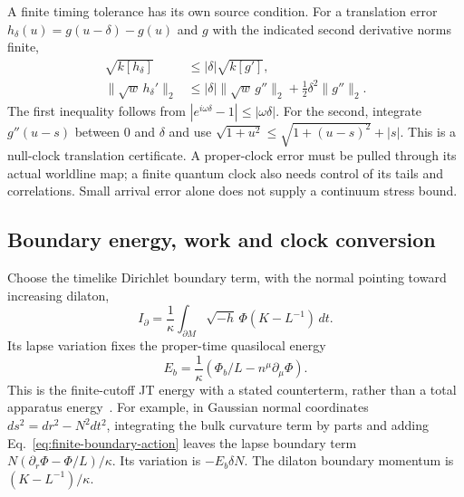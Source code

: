 A finite timing tolerance has its own source condition. For a translation
error $h_\delta(u)=g(u-\delta)-g(u)$ and $g$ with the indicated second
derivative norms finite,
\begin{align}
 \sqrt{k[h_\delta]}&\le|\delta|\sqrt{k[g']},\nonumber\\
 \|\sqrt w\,h_\delta'\|_2&\le
 |\delta|\|\sqrt w\,g''\|_2+\tfrac12\delta^2\|g''\|_2.
 \label{eq:clock-source-tolerance}
\end{align}
The first inequality follows from $|e^{i\omega\delta}-1|\le|\omega\delta|$.
For the second, integrate $g''(u-s)$ between $0$ and $\delta$ and use
$\sqrt{1+u^2}\le\sqrt{1+(u-s)^2}+|s|$.
This is a null-clock translation certificate. A proper-clock error must be
pulled through its actual worldline map; a finite quantum clock also needs
control of its tails and correlations. Small arrival error alone does not
supply a continuum stress bound.

\subsection{Boundary energy, work and clock conversion}
\label{sec:boundary-work}

Choose the timelike Dirichlet boundary term, with the normal pointing toward
increasing dilaton,
\begin{equation}\label{eq:finite-boundary-action}
 I_\partial=\frac1\kappa\int_{\partial M}
         \sqrt{-h}\,\Phi(K-L^{-1})\,dt .
\end{equation}
Its lapse variation fixes the proper-time quasilocal energy
\[
 E_b=\frac1\kappa(\Phi_b/L-n^\mu\partial_\mu\Phi).
\]
This is the finite-cutoff JT energy with a stated counterterm, rather than
a total apparatus energy~\cite[Sec.~6]{Griguolo2026Cutoff}.
For example, in Gaussian normal coordinates $ds^2=dr^2-N^2dt^2$,
integrating the bulk curvature term by parts and adding
Eq.~\eqref{eq:finite-boundary-action} leaves the lapse boundary term
$N(\partial_r\Phi-\Phi/L)/\kappa$. Its variation is $-E_b\delta N$.
The dilaton boundary momentum is $(K-L^{-1})/\kappa$.

